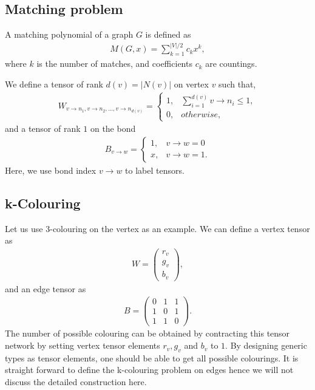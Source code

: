 \documentclass[review,onefignum,onetabnum]{siamart190516}
\newcommand{\<}{\langle}
\renewcommand{\>}{\rangle}
\newcounter{example}
\begin{document}
\subsection{Matching problem}
A matching polynomial of a graph $G$ is defined as
\begin{align}
    M(G, x) = \sum\limits_{k=1}^{|V|/2} c_k x^k,
\end{align}
where $k$ is the number of matches, and coefficients $c_k$ are countings.

We define a tensor of rank $d(v) = |N(v)|$ on vertex $v$ such that,
\begin{align}
    W_{v\rightarrow n_1, v\rightarrow n_2, \ldots, v\rightarrow n_{d(v)}} = \begin{cases}
        1, & \sum_{i=1}^{d(v)} v\rightarrow n_i \leq 1,\\
        0, & otherwise,
    \end{cases}
\end{align}
and a tensor of rank $1$ on the bond
\begin{align}
    B_{v\rightarrow w} = \begin{cases}
    1, & v \rightarrow w = 0 \\
    x, & v \rightarrow w = 1.
\end{cases}
\end{align}
Here, we use bond index $v \rightarrow w$ to label tensors.

\subsection{k-Colouring}
Let us use 3-colouring on the vertex as an example. We can define a vertex tensor as
\begin{align}
    W = \left(\begin{matrix}
        r_v\\
        g_v\\
        b_v
    \end{matrix}\right),
\end{align}
and an edge tensor as
\begin{align}
    B = \left(\begin{matrix}
        0 & 1 & 1\\
        1 & 0 & 1\\
        1 & 1 & 0
    \end{matrix}\right).
\end{align}
The number of possible colouring can be obtained by contracting this tensor network by setting vertex tensor elements $r_v, g_v$ and $b_v$ to $1$.
By designing generic types as tensor elements, one should be able to get all possible colourings.
It is straight forward to define the k-colouring problem on edges hence we will not discuss the detailed construction here.
\end{document}
